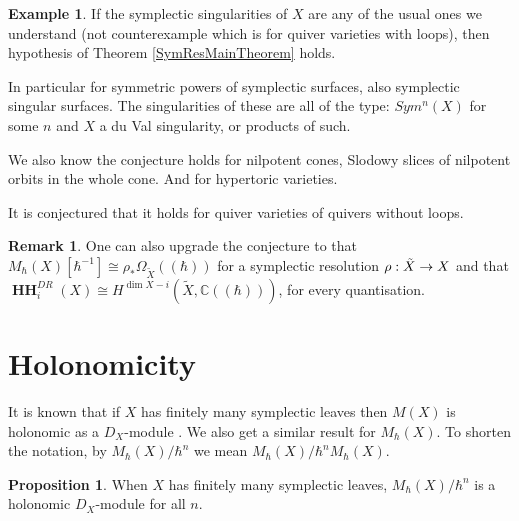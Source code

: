 \documentclass[draft]{article}
\theoremstyle{definition}
\newtheorem{proposition}[theorem]{Proposition}
\newtheorem{definition}[theorem]{Definition}
\newtheorem{example}[theorem]{Example}
\newtheorem{remark}[theorem]{Remark}
\DeclareMathOperator*{\supp}{supp}
\DeclareMathOperator{\Spec}{{Spec}}
\DeclareMathOperator{\gr}{gr}
\DeclareMathOperator{\HH}{\mathbf{HH}}
\newcommand{\MhX}{M_\hbar(X)}
\begin{document}
\begin{example}
If the symplectic singularities of $X$ are any of the usual ones we understand (not \cite{On_categories_O_of_quiver_varieties_overlying_the_bouquet_graphs} counterexample which is for quiver varieties with loops), then hypothesis of Theorem \ref{SymResMainTheorem} holds.

In particular for symmetric powers of symplectic surfaces, also symplectic singular surfaces. The singularities of these are all of the type: $Sym^n (X)$ for some $n$ and $X$ a du Val singularity, or products of such.

We also know the conjecture holds for nilpotent cones, Slodowy slices of nilpotent orbits in the whole cone. And for hypertoric varieties.

It is conjectured that it holds for quiver varieties of quivers without loops.
\end{example}

\begin{remark}
One can also upgrade the conjecture to that $\MhX[\hbar^{-1}] \cong \rho_* \Omega_{\tilde{X}}(\!( \hbar )\!)$ for a symplectic resolution $\rho:\Tilde{X}\to X$ and that $\HH^{DR}_i(X) \cong H^{\dim X - i} (\tilde{X}, \mathbb{C}(\!( \hbar )\!))$, for every quantisation.
\end{remark}


\section{Holonomicity}\label{Holonomicity}

It is known that if $X$ has finitely many symplectic leaves then $M(X)$ is holonomic as a $D_X$-module \cite[Theorem 1.1]{Poisson_Traces_and_D-Modules_on_Poisson_Varieties}. We also get a similar result for $\MhX$. To shorten the notation, by $\MhX/\hbar^n$ we mean $\MhX/\hbar^n\MhX$. 




\begin{proposition}
When $X$ has finitely many symplectic leaves, $\MhX/\hbar^n $ is a holonomic $D_X$-module for all $n$.
\end{proposition}
\end{document}
